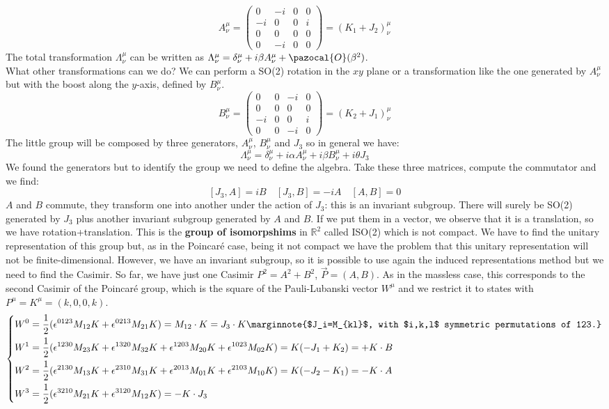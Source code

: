 \documentclass[../main.tex]{subfiles}
\begin{document}
\[
A^\mu_\nu=\left(\begin{array}{cccc}
    0 & -i & 0 & 0 \\
    -i & 0 & 0 & i \\
    0 & 0 & 0 & 0 \\
    0 & -i & 0 & 0
\end{array}\right)=(K_1+J_2)^\mu_\nu
\]
The total transformation $\Lambda^\mu_\nu$ can be written as $\Lambda^\mu_\nu=\delta^\mu_\nu+i\beta A^\mu_\nu+\pazocal{O}(\beta^2)$.\\
What other transformations can we do? We can perform a SO(2) rotation in the $xy$ plane or a transformation like the one generated by $A^\mu_\nu$ but with the boost along the $y$-axis, defined by $B^\mu_\nu$.
\[
B^\mu_\nu=\left(\begin{array}{cccc}
    0 & 0 & -i & 0 \\
    0 & 0 & 0 & 0 \\
    -i & 0 & 0 & i \\
    0 & 0 & -i & 0
\end{array}\right)=(K_2+J_1)^\mu_\nu
\]
The little group will be composed by three generators, $A^\mu_\nu$, $B^\mu_\nu$ and $J_3$ so in general we have:
\[
\Lambda^\mu_\nu=\delta^\mu_\nu+i\alpha A^\mu_\nu+i\beta B^\mu_\nu+i\theta J_3
\]
We found the generators but to identify the group we need to define the algebra. Take these three matrices, compute the commutator and we find:
\[
[J_3,A]=iB \quad [J_3,B]=-iA \quad [A,B]=0
\]
$A$ and $B$ commute, they transform one into another under the action of $J_3$: this is an invariant subgroup. There will surely be SO(2) generated by $J_3$ plus another invariant subgroup generated by $A$ and $B$. If we put them in a vector, we observe that it is a translation, so we have rotation+translation. This is the \textbf{group of isomorpshims} in $\mathbb{R}^2$ called ISO(2) which is not compact. We have to find the unitary representation of this group but, as in the Poincaré case, being it not compact we have the problem that this unitary representation will not be finite-dimensional. However, we have an invariant subgroup, so it is possible to use again the induced representations method but we need to find the Casimir. So far, we have just one Casimir $P^2=A^2+B^2$, $\vec{P}=(A,B)$. As in the massless case, this corresponds to the second Casimir of the Poincaré group, which is the square of the Pauli-Lubanski vector $W^\mu$ and we restrict it to states with $P^\mu=K^\mu=(k,0,0,k)$.
\[
\left\{
\begin{aligned}
&W^0=\frac{1}{2}(\epsilon^{0123}M_{12}K+\epsilon^{0213}M_{21}K)=M_{12}\cdot K=J_3\cdot K\marginnote{$J_i=M_{kl}$, with $i,k,l$ symmetric permutations of 123.}\\
&W^1=\frac{1}{2}(\epsilon^{1230}M_{23}K+\epsilon^{1320}M_{32}K+\epsilon^{1203}M_{20}K+\epsilon^{1023}M_{02}K)=K(-J_1+K_2)=+K\cdot B\\
&W^2=\frac{1}{2}(\epsilon^{2130}M_{13}K+\epsilon^{2310}M_{31}K+\epsilon^{2013}M_{01}K+\epsilon^{2103}M_{10}K)=K(-J_2-K_1)=-K\cdot A\\
&W^3=\frac{1}{2}(\epsilon^{3210}M_{21}K+\epsilon^{3120}M_{12}K)=-K\cdot J_3
\end{aligned}
\right.
\]
\end{document}
